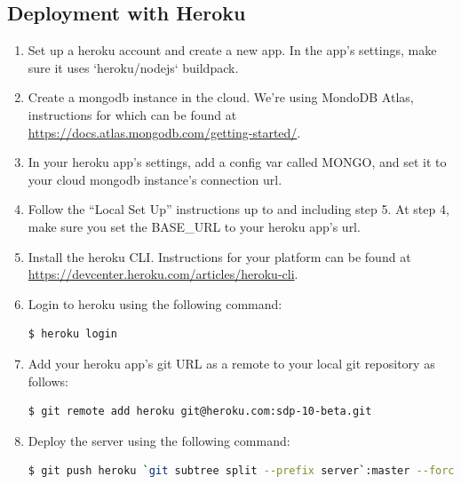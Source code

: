 \documentclass[onecolumn]{IEEEtran}
\begin{document}
\subsection{Deployment with Heroku}
\begin{enumerate}
    \item Set up a heroku account and create a new app. In the app’s settings, make sure it uses `heroku/nodejs` buildpack.
    \item Create a mongodb instance in the cloud. We’re using MondoDB Atlas, instructions for which can be found at \newline \underline{https://docs.atlas.mongodb.com/getting-started/}.
    \item In your heroku app’s settings, add a config var called MONGO, and set it to your cloud mongodb instance’s connection url.
    \item Follow the “Local Set Up” instructions up to and including step 5. At step 4, make sure you set the BASE\_URL to your heroku app’s url.
    \item Install the heroku CLI. Instructions for your platform can be found at \underline{https://devcenter.heroku.com/articles/heroku-cli}.
    \item Login to heroku using the following command:
    \begin{lstlisting}[language=bash]
    $ heroku login
    \end{lstlisting}
    \item Add your heroku app’s git URL as a remote to your local git repository as follows:
    \begin{lstlisting}[language=bash]
    $ git remote add heroku git@heroku.com:sdp-10-beta.git
    \end{lstlisting}
    \item Deploy the server using the following command:
    \begin{lstlisting}[language=bash]
    $ git push heroku `git subtree split --prefix server`:master --force
    \end{lstlisting}
\end{enumerate}
\end{document}
